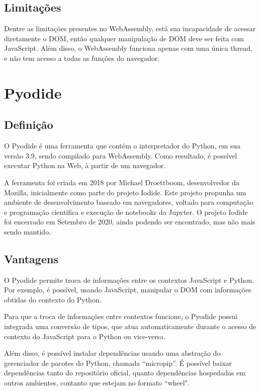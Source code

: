 \begin{apendicesenv}
\subsection{Limitações}

Dentre as limitações presentes no WebAssembly, está sua incapacidade de acessar diretamente o DOM, então qualquer manipulação de DOM deve ser feita com JavaScript. Além disso, o WebAssembly funciona apenas com uma única thread, e não tem acesso a todas as funções do navegador.


\section{Pyodide}

\subsection{Definição}

O Pyodide é uma ferramenta que contém o interpretador do Python, em sua versão 3.9, sendo compilado para WebAssembly. Como resultado, é possível executar Python na Web, à partir de um navegador.

A ferramenta foi criada em 2018 por Michael Droettboom, desenvolvedor da Mozilla, inicialmente como parte do projeto Iodide. Este projeto propunha um ambiente de desenvolvimento baseado em navegadores, voltado para computação e programação científica e execução de notebooks do Jupyter. O projeto Iodide foi encerrado em Setembro de 2020, ainda podendo ser encontrado, mas não mais sendo mantido.

\subsection{Vantagens}

O Pyodide permite troca de informações entre os contextos JavaScript e Python. Por exemplo, é possível, usando JavaScript, manipular o DOM com informações obtidas do contexto do Python.

Para que a troca de informações entre contextos funcione, o Pyodide possui integrada uma conversão de tipos, que atua automaticamente durante o acesso de contexto do JavaScript para o Python ou vice-versa.

Além disso, é possível instalar dependências usando uma abstração do gerenciador de pacotes do Python, chamada “micropip”. É possível baixar dependências tanto do repositório oficial, quanto dependências hospedadas em outros ambientes, contanto que estejam no formato “wheel".


\end{apendicesenv}
